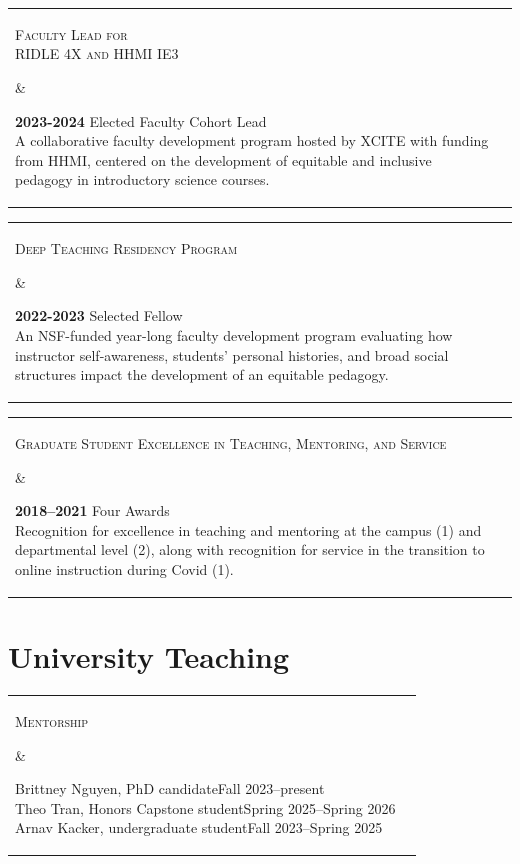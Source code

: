 \documentclass[]{article}
\begin{document}
\begin{tabular}{l | l}
\parbox{0.30\textwidth}{
\begin{center}
\textsc{Faculty Lead for\\ RIDLE 4X and HHMI IE3}
\end{center}
}
&
\parbox{0.65\textwidth}{
\textbf{2023-2024} Elected Faculty Cohort Lead\\
A collaborative faculty development program hosted by XCITE with funding from HHMI, centered on the development of equitable and inclusive pedagogy in introductory science courses.
}
\end{tabular}

\vspace{4mm}

\begin{tabular}{l | l}
\parbox{0.30\textwidth}{
\begin{center}
\textsc{Deep Teaching Residency Program}
\end{center}
}
&
\parbox{0.65\textwidth}{
\textbf{2022-2023} Selected Fellow\\
An NSF-funded year-long faculty development program evaluating how instructor self-awareness, students' personal histories, and broad social structures impact the development of an equitable pedagogy.}
\end{tabular}

\vspace{4mm}

\begin{tabular}{l | l}
\parbox{0.30\textwidth}{
\begin{center}
\textsc{Graduate Student Excellence in Teaching, Mentoring, and Service}
\end{center}
}
&
\parbox{0.65\textwidth}{
\textbf{2018--2021} Four Awards\\
Recognition for excellence in teaching and mentoring at the campus (1) and departmental level (2), along with recognition for service in the transition to online instruction during Covid (1).
}
\end{tabular}


\section{\fontsize{16}{48}\selectfont University Teaching}

\vspace{1.5mm}

\begin{tabular}{l | l}
\parbox{0.28\textwidth}{
\begin{center}
\textsc{Mentorship}
\end{center}
}
&
\parbox{0.62\textwidth}{
\renewcommand{\baselinestretch}{1.1}\normalsize

Brittney Nguyen, PhD candidate\hfill Fall 2023--present\\
Theo Tran, Honors Capstone student\hfill Spring 2025--Spring 2026\\
Arnav Kacker, undergraduate student\hfill Fall 2023--Spring 2025}

\renewcommand{\baselinestretch}{1}\normalsize


\end{tabular} 
\end{document}
